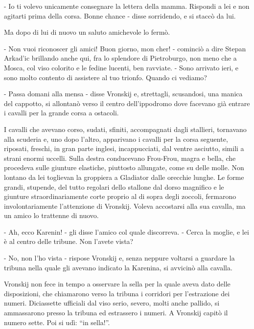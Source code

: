 - Io ti volevo unicamente consegnare la lettera della mamma. Rispondi a lei e non agitarti prima della corsa. Bonne chance - disse sorridendo, e si staccò da lui. 

Ma dopo di lui di nuovo un saluto amichevole lo fermò. 

- Non vuoi riconoscer gli amici! Buon giorno, mon cher! - cominciò a dire Stepan Arkad'ic brillando anche qui, fra lo splendore di Pietroburgo, non meno che a Mosca, col viso colorito e le fedine lucenti, ben ravviate. - Sono arrivato ieri, e sono molto contento di assistere al tuo trionfo. Quando ci vediamo? 

- Passa domani alla mensa - disse Vronskij e, strettagli, scusandosi, una manica del cappotto, si allontanò verso il centro dell'ippodromo dove facevano già entrare i cavalli per la grande corsa a ostacoli. 

I cavalli che avevano corso, sudati, sfiniti, accompagnati dagli stallieri, tornavano alla scuderia e, uno dopo l'altro, apparivano i cavalli per la corsa seguente, riposati, freschi, in gran parte inglesi, incappucciati, dal ventre asciutto, simili a strani enormi uccelli. Sulla destra conducevano Frou-Frou, magra e bella, che procedeva sulle giunture elastiche, piuttosto allungate, come su delle molle. Non lontano da lei toglievan la groppiera a Gladiator dalle orecchie lunghe. Le forme grandi, stupende, del tutto regolari dello stallone dal dorso magnifico e le giunture straordinariamente corte proprio al di sopra degli zoccoli, fermarono involontariamente l'attenzione di Vronskij. Voleva accostarsi alla sua cavalla, ma un amico lo trattenne di nuovo. 

- Ah, ecco Karenin! - gli disse l'amico col quale discorreva. - Cerca la moglie, e lei è al centro delle tribune. Non l'avete vista? 

- No, non l'ho vista - rispose Vronskij e, senza neppure voltarsi a guardare la tribuna nella quale gli avevano indicato la Karenina, si avvicinò alla cavalla. 

Vronskij non fece in tempo a osservare la sella per la quale aveva dato delle disposizioni, che chiamarono verso la tribuna i corridori per l'estrazione dei numeri. Diciassette ufficiali dal viso serio, severo, molti anche pallido, si ammassarono presso la tribuna ed estrassero i numeri. A Vronskij capitò il numero sette. Poi si udì: ``in sella!''. 

